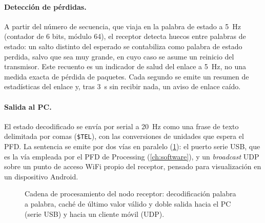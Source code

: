 \paragraph{Detección de pérdidas.}
A partir del número de secuencia, que viaja en la palabra de estado a
\SI{5}{\hertz} (contador de 6 bits, módulo 64), el receptor detecta huecos entre
palabras de estado: un salto distinto del esperado se contabiliza como palabra de
estado perdida, salvo que sea muy grande, en cuyo caso se asume un reinicio del
transmisor. Este recuento es un indicador de salud del enlace a \SI{5}{\hertz}, no
una medida exacta de pérdida de paquetes. Cada
segundo se emite un resumen de estadísticas del enlace y, tras \SI{3}{\second}
sin recibir nada, un aviso de enlace caído.

\paragraph{Salida al PC.}
El estado decodificado se envía por serial a \SI{20}{\hertz} como una frase de
texto delimitada por comas (\texttt{\$TEL}), con las conversiones de unidades que
espera el PFD. La sentencia se emite por dos vías en paralelo
(\cref{fig:rx_dataflow}): el puerto serie USB, que es la vía empleada por el PFD
de Processing (\cref{ch:software}), y un \textit{broadcast} UDP sobre un punto de
acceso WiFi propio del receptor, pensado para visualización en un dispositivo Android.

\begin{figure}[H]
    \centering
    \caption{Cadena de procesamiento del nodo receptor: decodificación palabra a
             palabra, caché de último valor válido y doble salida hacia el PC
             (serie USB) y hacia un cliente móvil (UDP).}
    \label{fig:rx_dataflow}
\end{figure}


